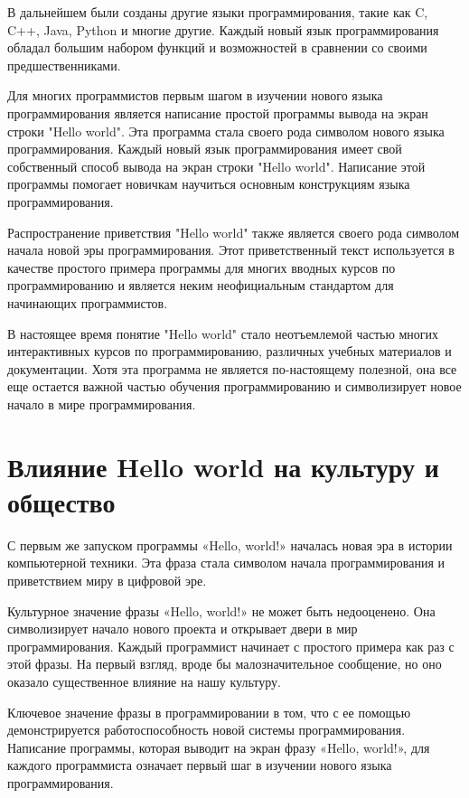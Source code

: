 \documentclass[draft]{article}
\begin{document}
В дальнейшем были созданы другие языки программирования, такие как C, C++, Java, Python и многие другие. Каждый новый язык программирования обладал большим набором функций и возможностей в сравнении со своими предшественниками.

Для многих программистов первым шагом в изучении нового языка программирования является написание простой программы вывода на экран строки "Hello world". Эта программа стала своего рода символом нового языка программирования. Каждый новый язык программирования имеет свой собственный способ вывода на экран строки "Hello world". Написание этой программы помогает новичкам научиться основным конструкциям языка программирования.

Распространение приветствия "Hello world" также является своего рода символом начала новой эры программирования. Этот приветственный текст используется в качестве простого примера программы для многих вводных курсов по программированию и является неким неофициальным стандартом для начинающих программистов.

В настоящее время понятие "Hello world" стало неотъемлемой частью многих интерактивных курсов по программированию, различных учебных материалов и документации. Хотя эта программа не является по-настоящему полезной, она все еще остается важной частью обучения программированию и символизирует новое начало в мире программирования.\newpage\section{Влияние Hello world на культуру и общество}

С первым же запуском программы «Hello, world!» началась новая эра в истории компьютерной техники. Эта фраза стала символом начала программирования и приветствием миру в цифровой эре.

Культурное значение фразы «Hello, world!» не может быть недооценено. Она символизирует начало нового проекта и открывает двери в мир программирования. Каждый программист начинает с простого примера как раз с этой фразы. На первый взгляд, вроде бы малозначительное сообщение, но оно оказало существенное влияние на нашу культуру.

Ключевое значение фразы в программировании в том, что с ее помощью демонстрируется работоспособность новой системы программирования. Написание программы, которая выводит на экран фразу «Hello, world!», для каждого программиста означает первый шаг в изучении нового языка программирования.
\end{document}
